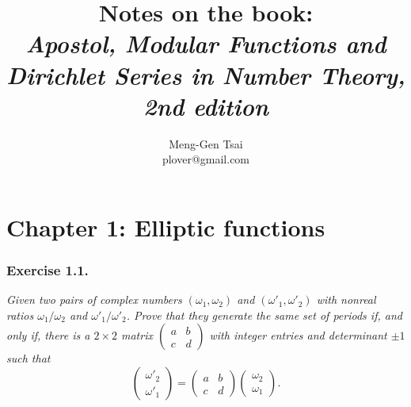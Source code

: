 \documentclass{article}
\title{\textbf{Notes on the book: \\
\emph{Apostol, Modular Functions and Dirichlet Series in Number Theory, 2nd edition}}}
\author{Meng-Gen Tsai \\ plover@gmail.com}
\begin{document}
\maketitle
\tableofcontents












\newpage
\section*{Chapter 1: Elliptic functions \\}






\subsubsection*{Exercise 1.1.}
\emph{Given two pairs of complex numbers $(\omega_1,\omega_2)$ and $(\omega'_1,\omega'_2)$
with nonreal ratios $\omega_1/\omega_2$ and $\omega'_1/\omega'_2$.
Prove that they generate the same set of periods if, and only if,
there is a $2 \times 2$ matrix
$\begin{pmatrix}
  a & b \\
  c & d
\end{pmatrix}$
with integer entries and determinant $\pm 1$ such that}
\[
  \begin{pmatrix}
    \omega'_2 \\
    \omega'_1
  \end{pmatrix}
  =
  \begin{pmatrix}
    a & b \\
    c & d
  \end{pmatrix}
  \begin{pmatrix}
    \omega_2 \\
    \omega_1
  \end{pmatrix}.
\] \\
\end{document}
